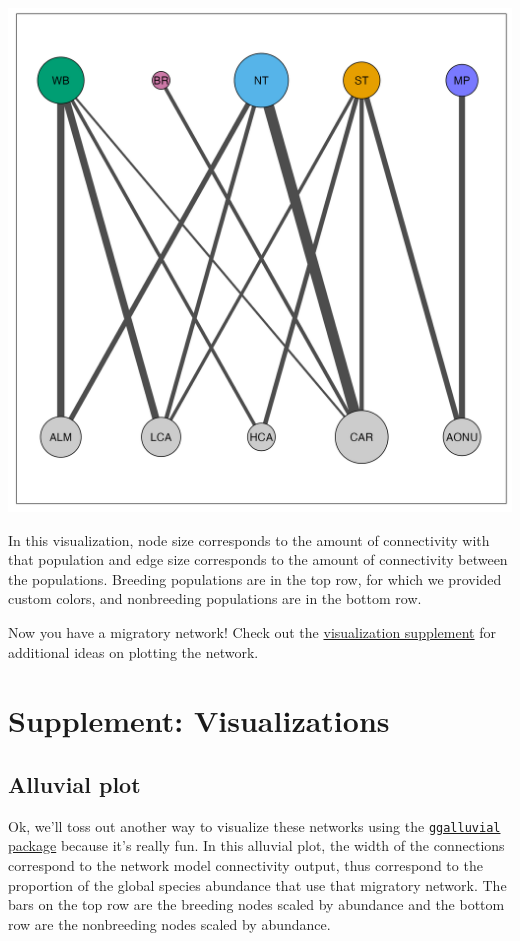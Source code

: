 \documentclass[
]{book}
\begin{document}
\includegraphics[width=29.17in]{./images/p.amre.net}

In this visualization, node size corresponds to the amount of connectivity with that population and edge size corresponds to the amount of connectivity between the populations. Breeding populations are in the top row, for which we provided custom colors, and nonbreeding populations are in the bottom row.

Now you have a migratory network! Check out the \protect\hyperlink{visualization}{visualization supplement} for additional ideas on plotting the network.

\hypertarget{visualization}{%
\chapter{Supplement: Visualizations}\label{visualization}}

\hypertarget{alluvial-plot}{%
\section{Alluvial plot}\label{alluvial-plot}}

Ok, we'll toss out another way to visualize these networks using the \href{https://cran.r-project.org/web/packages/ggalluvial/vignettes/ggalluvial.htm}{\texttt{ggalluvial} package} because it's really fun. In this alluvial plot, the width of the connections correspond to the network model connectivity output, thus correspond to the proportion of the global species abundance that use that migratory network. The bars on the top row are the breeding nodes scaled by abundance and the bottom row are the nonbreeding nodes scaled by abundance.
\end{document}
